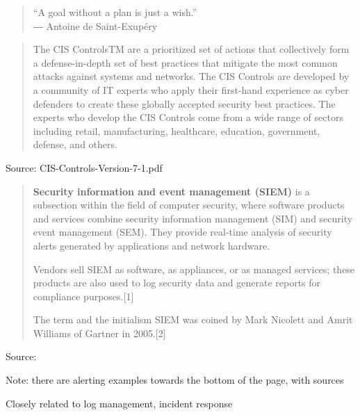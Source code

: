 \documentclass[Screen16to9,17pt]{foils}
\begin{document}

\begin{quote}
  “A goal without a plan is just a wish.”\\
  ― Antoine de Saint-Exupéry
\end{quote}

\begin{quote}
  The CIS ControlsTM are a prioritized set of actions that collectively form a defense-in-depth set
of best practices that mitigate the most common attacks against systems and networks. The
CIS Controls are developed by a community of IT experts who apply their first-hand experience
as cyber defenders to create these globally accepted security best practices. The experts who
develop the CIS Controls come from a wide range of sectors including retail, manufacturing,
healthcare, education, government, defense, and others.
\end{quote}

Source:  CIS-Controls-Version-7-1.pdf




\begin{quote}
{\bf Security information and event management (SIEM)} is a subsection within the field of computer security, where software products and services combine security information management (SIM) and security event management (SEM). They provide real-time analysis of security alerts generated by applications and network hardware.

  Vendors sell SIEM as software, as appliances, or as managed services; these products are also used to log security data and generate reports for compliance purposes.[1]

  The term and the initialism SIEM was coined by Mark Nicolett and Amrit Williams of Gartner in 2005.[2]
\end{quote}
Source: 

\begin{list2}
  \item Note: there are alerting examples towards the bottom of the page, with sources
  \item Closely related to log management, incident response
\end{list2}



\end{document}
